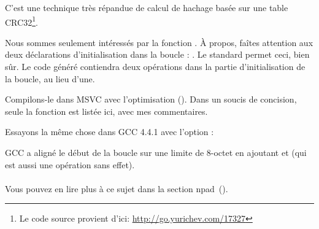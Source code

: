 \label{sec:CRC32}

\newcommand{\URLCRCSRC}{\url{http://go.yurichev.com/17327}}

C'est une technique très répandue de calcul de hachage basée sur une table
CRC32\footnote{Le code source provient d'ici: \URLCRCSRC}.




Nous sommes seulement intéressés par la fonction .
À propos, faîtes attention aux deux déclarations d'initialisation dans la boucle
: .
Le standard \CCpp permet ceci, bien sûr.
Le code généré contiendra deux opérations dans la partie d'initialisation de la boucle,
au lieu d'une.

Compilons-le dans MSVC avec l'optimisation (\Ox).
Dans un soucis de concision, seule la fonction  est listée ici, avec mes
commentaires.



Essayons la même chose dans GCC 4.4.1 avec l'option \Othree:




GCC a aligné le début de la boucle sur une limite de 8-octet en ajoutant \NOP et
 (qui est aussi une opération sans effet).\\
\\
Vous pouvez en lire plus à ce sujet dans la section npad~().

